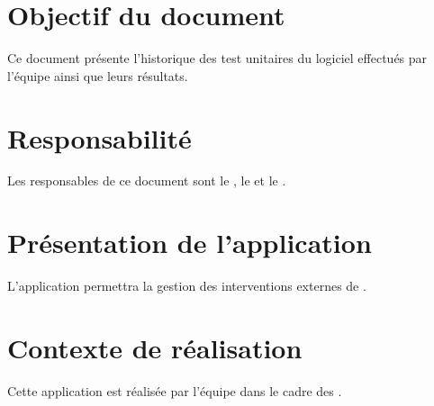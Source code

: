 \section*{Objectif du document}
	Ce document présente l'historique des test unitaires du logiciel effectués par l'équipe \nomEquipe{} ainsi que leurs résultats.	
	
\section*{Responsabilité}
	Les responsables de ce document sont le \CP, le \RQ{} et le \RD.
	
\section*{Présentation de l'application}
	L'application permettra la gestion des interventions externes de \nomClient.
	
\section*{Contexte de réalisation}
	Cette application est réalisée par l'équipe \nomEquipe{} dans le cadre des \PIC.

